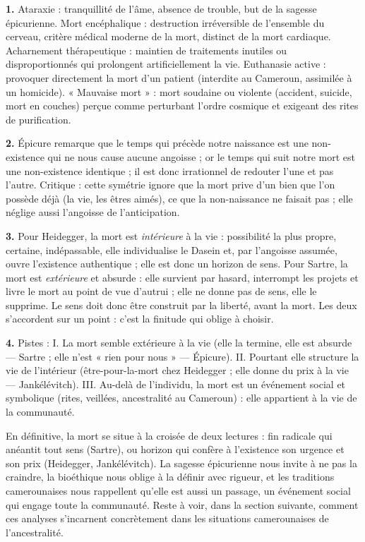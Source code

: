 \documentclass[11pt]{article}
\begin{document}
\begin{corrige}[Exercice]
\textbf{1.} Ataraxie : tranquillité de l'âme, absence de trouble, but de la sagesse épicurienne. Mort encéphalique : destruction irréversible de l'ensemble du cerveau, critère médical moderne de la mort, distinct de la mort cardiaque. Acharnement thérapeutique : maintien de traitements inutiles ou disproportionnés qui prolongent artificiellement la vie. Euthanasie active : provoquer directement la mort d'un patient (interdite au Cameroun, assimilée à un homicide). « Mauvaise mort » : mort soudaine ou violente (accident, suicide, mort en couches) perçue comme perturbant l'ordre cosmique et exigeant des rites de purification.

\textbf{2.} Épicure remarque que le temps qui précède notre naissance est une non-existence qui ne nous cause aucune angoisse ; or le temps qui suit notre mort est une non-existence identique ; il est donc irrationnel de redouter l'une et pas l'autre. Critique : cette symétrie ignore que la mort prive d'un bien que l'on possède déjà (la vie, les êtres aimés), ce que la non-naissance ne faisait pas ; elle néglige aussi l'angoisse de l'anticipation.

\textbf{3.} Pour Heidegger, la mort est \emph{intérieure} à la vie : possibilité la plus propre, certaine, indépassable, elle individualise le Dasein et, par l'angoisse assumée, ouvre l'existence authentique ; elle est donc un horizon de sens. Pour Sartre, la mort est \emph{extérieure} et absurde : elle survient par hasard, interrompt les projets et livre le mort au point de vue d'autrui ; elle ne donne pas de sens, elle le supprime. Le sens doit donc être construit par la liberté, avant la mort. Les deux s'accordent sur un point : c'est la finitude qui oblige à choisir.

\textbf{4.} Pistes : I. La mort semble extérieure à la vie (elle la termine, elle est absurde — Sartre ; elle n'est « rien pour nous » — Épicure). II. Pourtant elle structure la vie de l'intérieur (être-pour-la-mort chez Heidegger ; elle donne du prix à la vie — Jankélévitch). III. Au-delà de l'individu, la mort est un événement social et symbolique (rites, veillées, ancestralité au Cameroun) : elle appartient à la vie de la communauté.
\end{corrige}

En définitive, la mort se situe à la croisée de deux lectures : fin radicale qui anéantit tout sens (Sartre), ou horizon qui confère à l'existence son urgence et son prix (Heidegger, Jankélévitch). La sagesse épicurienne nous invite à ne pas la craindre, la bioéthique nous oblige à la définir avec rigueur, et les traditions camerounaises nous rappellent qu'elle est aussi un passage, un événement social qui engage toute la communauté. Reste à voir, dans la section suivante, comment ces analyses s'incarnent concrètement dans les situations camerounaises de l'ancestralité.
\end{document}
